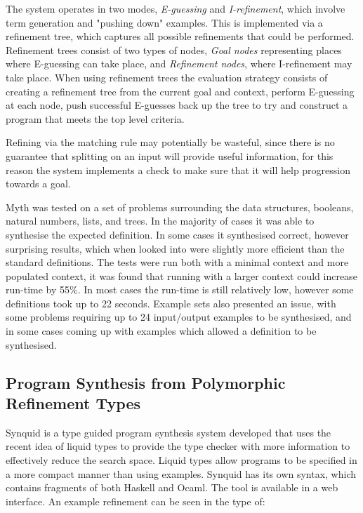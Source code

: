 \documentclass[a4paper]{article}
\begin{document}
The system operates in two modes, \emph{E-guessing} and \emph{I-refinement}, which involve term generation and "pushing down" examples. This is implemented via a 
refinement tree, which captures all possible refinements that could be performed. Refinement trees consist of two types of nodes, \emph{Goal nodes} representing 
places where E-guessing can take place, and \emph{Refinement nodes}, where I-refinement may take place. When using refinement 
trees the evaluation strategy consists of creating a refinement tree from the current goal and context, perform E-guessing at 
each node, push successful E-guesses back up the tree to try and construct a program that meets the top level criteria. 

Refining via the matching rule may potentially be wasteful, since there is no guarantee that splitting on an input will
provide useful information, for this reason the system implements a check to make sure that 
it will help progression towards a goal. 

Myth was tested on a set of problems surrounding the data structures, booleans, natural numbers, lists, and trees. In the majority of 
cases it was able to synthesise the expected definition. In some cases it synthesised correct, however surprising results, which 
when looked into were slightly more efficient than the standard definitions. The tests were run both with a minimal context and 
more populated context, it was found that running with a larger context could increase run-time by 55\%. In most cases the run-time 
is still relatively low, however some definitions took up to 22 seconds. Example sets also presented an issue, with some 
problems requiring up to 24 input/output examples to be synthesised, and in some cases coming up with examples which allowed a definition to be synthesised. 

\subsection{Program Synthesis from Polymorphic Refinement Types}
\label{sec:org9bb7fb1}
Synquid is a type guided program synthesis system developed that uses the recent idea of liquid types to provide the 
type checker with more information to effectively reduce the search space.
Liquid types allow programs to be specified in a more compact manner than using examples. Synquid has
its own syntax, which contains fragments of both Haskell and Ocaml. The tool is available in a web interface. An example refinement can be seen in the type of:
\end{document}
